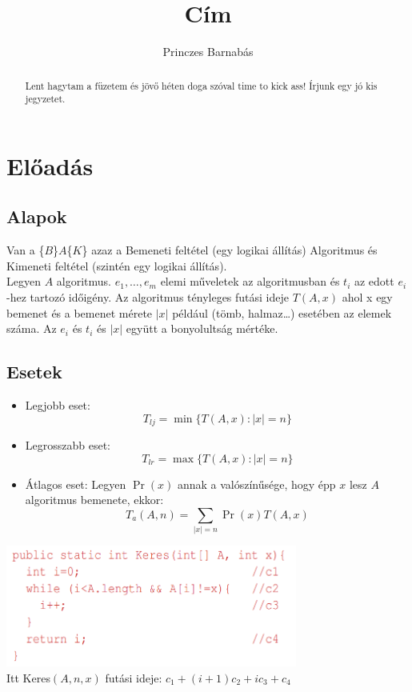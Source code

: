 \documentclass{article}
\title{Cím}
\author{Princzes
Barnabás}
\theoremstyle{mytheoremstyle}
\theoremstyle{mytheoremstyle}
\theoremstyle{myproblemstyle}
\begin{document}
\maketitle
\begin{abstract}
    Lent hagytam a füzetem és jövő héten doga szóval time to kick ass!
    Írjunk egy jó kis jegyzetet.
\end{abstract}
\section{Előadás}
\subsection{Alapok}
Van a \{$B$\}$A$\{$K$\} azaz a Bemeneti
feltétel (egy logikai állítás) Algoritmus és Kimeneti feltétel
(szintén egy logikai állítás).
\\
Legyen $A$ algoritmus. $e_1,\ldots,e_m$ elemi műveletek az algoritmusban
és $t_i$ az edott $e_i$-hez tartozó időigény. Az algoritmus tényleges futási ideje
$T(A,x)$ ahol x egy bemenet és a bemenet mérete $|x|$ például
(tömb, halmaz\ldots) esetében az elemek száma.
Az $e_i$ és $t_i$ és $|x|$ együtt a bonyolultság mértéke.

\subsection{Esetek}
\begin{itemize}
    \item Legjobb eset: \[T_{lj} = \min \{T(A,x):|x|=n\}\]
    \item Legrosszabb eset: \[T_{lr} = \max\{T(A,x):|x|=n\}\]
    \item Átlagos eset: Legyen $\Pr(x)$ annak
          a valószínűsége, hogy épp $x$ lesz
          $A$ algoritmus bemenete, ekkor:
          \\ \[T_a(A,n) = \sum_{|x|=n}\Pr(x)T(A,x)\]
\end{itemize}
\begin{center}
    \includegraphics[height=4cm]{keres}
    \\
    Itt Keres$(A,n,x)$ futási ideje: $c_1+(i+1)c_2+ic_3+c_4$
\end{center}
\end{document}
